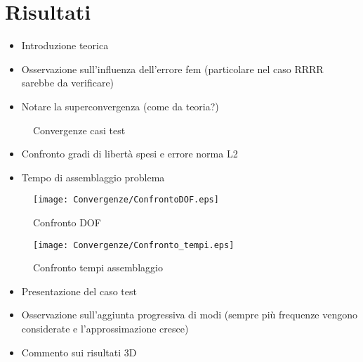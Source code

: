 \chapter{Risultati}

\begin{itemize}
\item Introduzione teorica
\item Osservazione sull'influenza dell'errore fem (particolare nel caso RRRR sarebbe da verificare)
\item Notare la superconvergenza (come da teoria?)
\end{itemize}

\begin{figure}[!htbp]
        \centering%
        \qquad
        \qquad
		\qquad
        \label{fig: convergenze}
        \caption{Convergenze casi test}
\end{figure}

\begin{itemize}
\item Confronto gradi di libert\`a spesi e errore norma L2
\item Tempo di assemblaggio problema
\end{itemize}
\begin{figure}[!h]
\centering
          \texttt{[image: Convergenze/ConfrontoDOF.eps]}\qquad
        \caption{ Confronto DOF}
        \label{fig: Confronto DOF}
\end{figure}

\begin{figure}[!h]
\centering
          \texttt{[image: Convergenze/Confronto\_tempi.eps]}\qquad
        \caption{ Confronto tempi assemblaggio}
        \label{fig: Confronto tempi}
\end{figure}

\begin{itemize}
\item Presentazione del caso test
\item Osservazione sull'aggiunta progressiva di modi (sempre pi\`u frequenze vengono considerate e l'approssimazione cresce)
\item Commento sui risultati 3D
\end{itemize}

